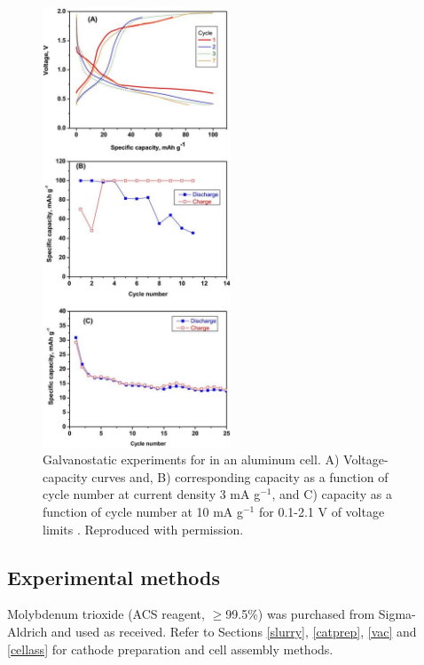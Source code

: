 \begin{figure}[th!]
\centering
\includegraphics[width=0.5\textwidth]{Figures/chap6fig/moo3pap}
\caption{Galvanostatic experiments for  in an aluminum cell. A) Voltage-capacity curves and, B) corresponding capacity as a function of cycle number at current density 3 mA g$^{-1}$, and C) capacity as a function of cycle number at 10 mA g$^{-1}$ for 0.1-2.1 V of voltage limits \cite{nacimiento_exploring_2018}. Reproduced with permission.}
\label{Figures/chap6fig:moo3pap}
\end{figure}

\subsection{Experimental methods}
Molybdenum trioxide (ACS reagent, $\geq$99.5\%) was purchased from Sigma-Aldrich and used as received. Refer to Sections \ref{slurry}, \ref{catprep}, \ref{vac} and \ref{cellass} for cathode preparation and cell assembly methods. 

